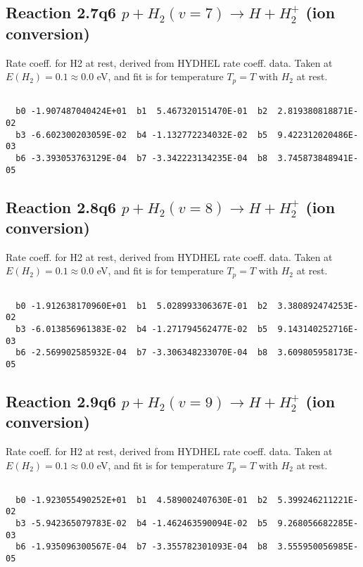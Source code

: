 \newpage
\subsection{
Reaction 2.7q6
$ p + H_2(v=7) \rightarrow H + H_2^+$ (ion conversion)
}
Rate coeff. for H2 at rest, derived from HYDHEL rate coeff. data.
Taken at $E(H_2) = 0.1 \approx 0.0$ eV,  and fit is for temperature $T_p=T$ with $H_2$ at rest.

\begin{small}\begin{verbatim}

  b0 -1.907487040424E+01  b1  5.467320151470E-01  b2  2.819380818871E-02
  b3 -6.602300203059E-02  b4 -1.132772234032E-02  b5  9.422312020486E-03
  b6 -3.393053763129E-04  b7 -3.342223134235E-04  b8  3.745873848941E-05

\end{verbatim}\end{small}

\newpage
\subsection{
Reaction 2.8q6
$ p + H_2(v=8) \rightarrow H + H_2^+$ (ion conversion)
}
Rate coeff. for H2 at rest, derived from HYDHEL rate coeff. data.
Taken at $E(H_2) = 0.1 \approx 0.0$ eV,  and fit is for temperature $T_p=T$ with $H_2$ at rest.

\begin{small}\begin{verbatim}

  b0 -1.912638170960E+01  b1  5.028993306367E-01  b2  3.380892474253E-02
  b3 -6.013856961383E-02  b4 -1.271794562477E-02  b5  9.143140252716E-03
  b6 -2.569902585932E-04  b7 -3.306348233070E-04  b8  3.609805958173E-05

\end{verbatim}\end{small}

\newpage
\subsection{
Reaction 2.9q6
$ p + H_2(v=9) \rightarrow H + H_2^+$ (ion conversion)
}
Rate coeff. for H2 at rest, derived from HYDHEL rate coeff. data.
Taken at $E(H_2) = 0.1 \approx 0.0$ eV,  and fit is for temperature $T_p=T$ with $H_2$ at rest.

\begin{small}\begin{verbatim}

  b0 -1.923055490252E+01  b1  4.589002407630E-01  b2  5.399246211221E-02
  b3 -5.942365079783E-02  b4 -1.462463590094E-02  b5  9.268056682285E-03
  b6 -1.935096300567E-04  b7 -3.355782301093E-04  b8  3.555950056985E-05

\end{verbatim}\end{small}

